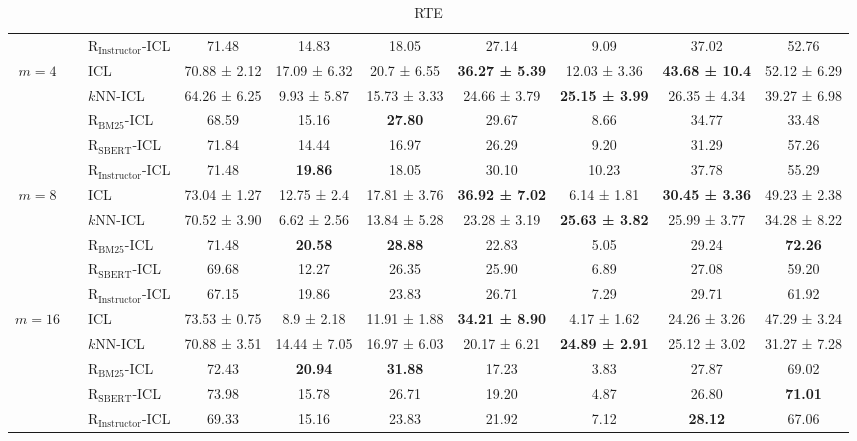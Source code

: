 \begin{table*}[]
\begin{tabular}{cclc|cccccc}
     & & $\text{R}_{\text{Instructor}}$-ICL & 71.48 & 14.83 & 18.05 & 27.14 & 9.09 & 37.02 & 52.76 \\
    \multirow{5}{*}{{$m=4$}} & \rowcolor{lightgray}  & ICL & 70.88 ± 2.12 & 17.09 ± 6.32 & 20.7 ± 6.55 & \textbf{36.27 ± 5.39} & 12.03 ± 3.36 & \textbf{43.68 ± 10.4} & 52.12 ± 6.29 \\
     & \rowcolor{lightgray} \multirow{-2}{*}{Random} & $k$NN-ICL & 64.26 ± 6.25 & 9.93 ± 5.87 & 15.73 ± 3.33 & 24.66 ± 3.79 & \textbf{25.15 ± 3.99} & 26.35 ± 4.34 & 39.27 ± 6.98  \\ 
     & & $\text{R}_{\text{BM25}}$-ICL & 68.59 & 15.16 & \textbf{27.80} & 29.67 & 8.66 & 34.77 & 33.48 \\ 
     & &  $\text{R}_{\text{SBERT}}$-ICL & 71.84 & 14.44 & 16.97 & 26.29 & 9.20 & 31.29 & 57.26 \\ 
     & & $\text{R}_{\text{Instructor}}$-ICL & 71.48 & \textbf{19.86} & 18.05 & 30.10 & 10.23 & 37.78 & 55.29 \\
     \multirow{5}{*}{{$m=8$}} & \rowcolor{lightgray} & ICL & 73.04 ± 1.27  & 12.75 ± 2.4 & 17.81 ± 3.76 & \textbf{36.92 ± 7.02} & 6.14 ± 1.81 & \textbf{30.45 ± 3.36} & 49.23 ± 2.38 \\
     & \rowcolor{lightgray} \multirow{-2}{*}{Random} & $k$NN-ICL & 70.52 ± 3.90 & 6.62 ± 2.56  & 13.84 ± 5.28 & 23.28 ± 3.19 & \textbf{25.63 ± 3.82} & 25.99 ± 3.77 & 34.28 ± 8.22 \\ 
         & & $\text{R}_{\text{BM25}}$-ICL & 71.48 & \textbf{20.58} & \textbf{28.88} & 22.83 & 5.05 & 29.24 & \textbf{72.26} \\ 
         & &  $\text{R}_{\text{SBERT}}$-ICL & 69.68 & 12.27 & 26.35 & 25.90 & 6.89 & 27.08 & 59.20 \\ 
         & & $\text{R}_{\text{Instructor}}$-ICL & 67.15 & {19.86} & 23.83 & 26.71 & 7.29 & 29.71 & 61.92 \\
        \multirow{5}{*}{{$m=16$}} & \rowcolor{lightgray} & ICL & 73.53 ± 0.75 & 8.9 ± 2.18 & 11.91 ± 1.88 & \textbf{34.21 ± 8.90} & 4.17 ± 1.62 & 24.26 ± 3.26 & 47.29 ± 3.24 \\
         & \rowcolor{lightgray} \multirow{-2}{*}{Random} & $k$NN-ICL & 70.88 ± 3.51 & 14.44 ± 7.05 & 16.97 ± 6.03 & 20.17 ± 6.21 & \textbf{24.89 ± 2.91} & 25.12 ± 3.02 & 31.27 ± 7.28	\\ 
         & & $\text{R}_{\text{BM25}}$-ICL & 72.43 & \textbf{20.94} & \textbf{31.88} & 17.23 & 3.83 & 27.87 & 69.02 \\ 
         & & $\text{R}_{\text{SBERT}}$-ICL & 73.98 & 15.78 & 26.71 & 19.20 & 4.87 & 26.80 & \textbf{71.01}  \\ 
         & & $\text{R}_{\text{Instructor}}$-ICL & 69.33 & 15.16 & 23.83 & 21.92 & 7.12 & \textbf{28.12} & 67.06 \\
    \bottomrule
    \end{tabular}
    \caption{RTE}
\end{table*}
